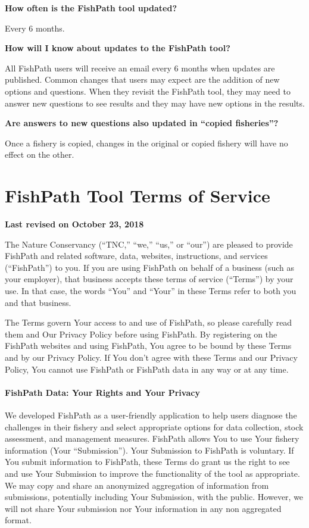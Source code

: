 \documentclass[
  11pt,
]{book}
\begin{document}
\textbf{How often is the FishPath tool updated?}

Every 6 months.

\textbf{How will I know about updates to the FishPath tool?}

All FishPath users will receive an email every 6 months when updates are published. Common changes that users may expect are the addition of new options and questions. When they revisit the FishPath tool, they may need to answer new questions to see results and they may have new options in the results.

\textbf{Are answers to new questions also updated in ``copied fisheries''?}

Once a fishery is copied, changes in the original or copied fishery will have no effect on the other.

\hypertarget{terms}{%
\chapter{FishPath Tool Terms of Service}\label{terms}}

\textbf{Last revised on October 23, 2018}

The Nature Conservancy (``TNC,'' ``we,'' ``us,'' or ``our'') are pleased to provide FishPath and related software, data, websites, instructions, and services (``FishPath'') to you. If you are using FishPath on behalf of a business (such as your employer), that business accepts these terms of service (``Terms'') by your use. In that case, the words ``You'' and ``Your'' in these Terms refer to both you and that business.

The Terms govern Your access to and use of FishPath, so please carefully read them and Our Privacy Policy before using FishPath. By registering on the FishPath websites and using FishPath, You agree to be bound by these Terms and by our Privacy Policy. If You don't agree with these Terms and our Privacy Policy, You cannot use FishPath or FishPath data in any way or at any time.

\hypertarget{fishpath-data-your-rights-and-your-privacy}{%
\subsubsection*{FishPath Data: Your Rights and Your Privacy}\label{fishpath-data-your-rights-and-your-privacy}}

We developed FishPath as a user-friendly application to help users diagnose the challenges in their fishery and select appropriate options for data collection, stock assessment, and management measures. FishPath allows You to use Your fishery information (Your ``Submission''). Your Submission to FishPath is voluntary. If You submit information to FishPath, these Terms do grant us the right to see and use Your Submission to improve the functionality of the tool as appropriate. We may copy and share an anonymized aggregation of information from submissions, potentially including Your Submission, with the public. However, we will not share Your submission nor Your information in any non aggregated format.
\end{document}
